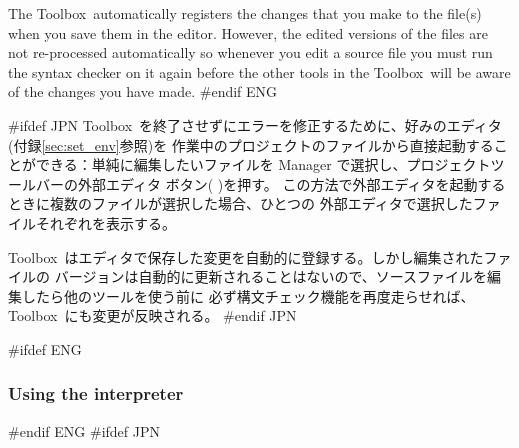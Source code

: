 \documentclass[\pformat,12pt]{article}
\newcommand{\Toolbox}{Toolbox}
\newcommand{\Toolbox}{Toolbox}
\newcommand{\guicmd}[1]{{\sf #1}}
\newcommand{\guicmd}[1]{{\gt #1}}
\begin{document}
The \Toolbox\ automatically registers the changes that you make to the
file(s) when you save them in the editor. However, the edited versions
of the files are not re-processed automatically so whenever you edit a
source file you must run the syntax checker on it again before the
other tools in the \Toolbox\ will be aware of the changes you have
made.
#endif ENG

#ifdef JPN
\Toolbox\ を終了させずにエラーを修正するために、好みのエディタ(付録\ref{sec:set_env}参照)を
作業中のプロジェクトのファイルから直接起動することができる：単純に編集したいファイルを
\guicmd{Manager} で選択し、\guicmd{プロジェクト}ツールバーの\guicmd{外部エディタ}
 ボタン(%
)を押す。
この方法で\guicmd{外部エディタ}を起動するときに複数のファイルが選択した場合、ひとつの
\guicmd{外部エディタ}で選択したファイルそれぞれを表示する。

\Toolbox\ はエディタで保存した変更を自動的に登録する。しかし編集されたファイルの
バージョンは自動的に更新されることはないので、ソースファイルを編集したら他のツールを使う前に
必ず構文チェック機能を再度走らせれば、\Toolbox\ にも変更が反映される。
#endif JPN



#ifdef ENG
\subsubsection{Using the interpreter}
#endif ENG
#ifdef JPN
\end{document}
